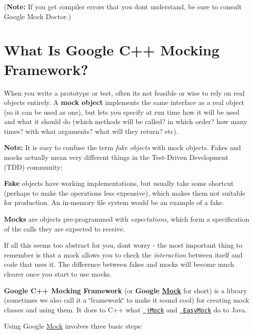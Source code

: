 ({\bfseries{Note\+:}} If you get compiler errors that you don\textquotesingle{}t understand, be sure to consult Google Mock Doctor.)

\section*{What Is Google C++ Mocking Framework?}

When you write a prototype or test, often it\textquotesingle{}s not feasible or wise to rely on real objects entirely. A {\bfseries{mock object}} implements the same interface as a real object (so it can be used as one), but lets you specify at run time how it will be used and what it should do (which methods will be called? in which order? how many times? with what arguments? what will they return? etc).

{\bfseries{Note\+:}} It is easy to confuse the term {\itshape fake objects} with mock objects. Fakes and mocks actually mean very different things in the Test-\/\+Driven Development (T\+DD) community\+:


\begin{DoxyItemize}
\item {\bfseries{Fake}} objects have working implementations, but usually take some shortcut (perhaps to make the operations less expensive), which makes them not suitable for production. An in-\/memory file system would be an example of a fake.
\item {\bfseries{Mocks}} are objects pre-\/programmed with {\itshape expectations}, which form a specification of the calls they are expected to receive.
\end{DoxyItemize}

If all this seems too abstract for you, don\textquotesingle{}t worry -\/ the most important thing to remember is that a mock allows you to check the {\itshape interaction} between itself and code that uses it. The difference between fakes and mocks will become much clearer once you start to use mocks.

{\bfseries{Google C++ Mocking Framework}} (or {\bfseries{Google \mbox{\hyperlink{class_mock}{Mock}}}} for short) is a library (sometimes we also call it a \char`\"{}framework\char`\"{} to make it sound cool) for creating mock classes and using them. It does to C++ what \href{http://www.jmock.org/}\texttt{ j\+Mock} and \href{http://www.easymock.org/}\texttt{ Easy\+Mock} do to Java.

Using Google \mbox{\hyperlink{class_mock}{Mock}} involves three basic steps\+:


